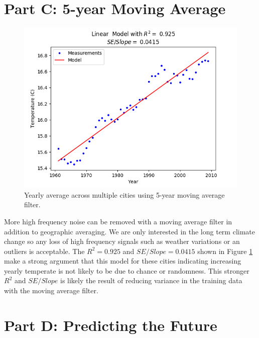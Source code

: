 \documentclass[letterpaper]{article}
\begin{document}
	\section*{Part C: 5-year Moving Average}
	\begin{figure}[h]
		\includegraphics[scale=0.625]{Figure_4_C}
		\centering
		\caption{Yearly average across multiple cities using 5-year moving average filter.}
		\label{fig:Moving Avg}
	\end{figure}
	More high frequency noise can be removed with a moving average filter in addition to geographic averaging.
	We are only interested in the long term climate change so any loss of high frequency signals such as weather variations or an outliers is acceptable.
	The $R^2 = 0.925$ and $SE/Slope = 0.0415$ shown in Figure \ref{fig:Moving Avg} make a strong argument that this model for these cities indicating increasing yearly temperate is not likely to be due to chance or randomness.
	This stronger $R^2$ and $SE/Slope$ is likely the result of reducing variance in the training data with the moving average filter.

	\section*{Part D: Predicting the Future}
\end{document}
